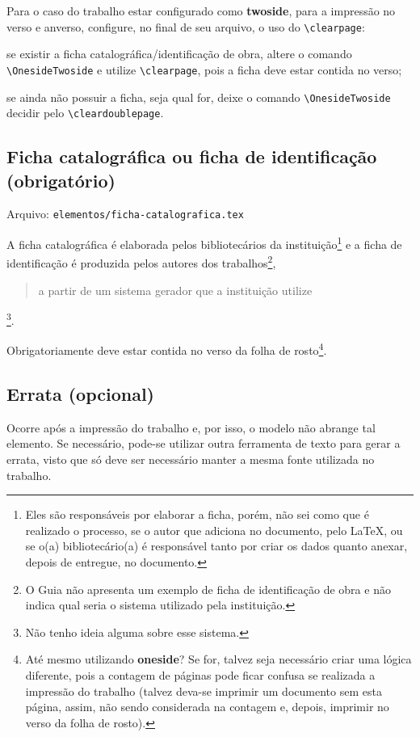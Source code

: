     Para o caso do trabalho estar configurado como \textbf{twoside}, para a impressão no verso e anverso, configure, no final de seu arquivo, o uso do \verb|\clearpage|:
    \begin{alinea}
        \item se existir a ficha catalográfica/identificação de obra, altere o comando \verb|\OnesideTwoside| e utilize \verb|\clearpage|, pois a ficha deve estar contida no verso;
        \item se ainda não possuir a ficha, seja qual for, deixe o comando \verb|\OnesideTwoside| decidir pelo \verb|\cleardoublepage|.
    \end{alinea}

\subsection{Ficha catalográfica ou ficha de identificação (obrigatório)}
    Arquivo: \texttt{elementos/ficha-catalografica.tex}

    A ficha catalográfica é elaborada pelos bibliotecários da instituição\footnote{Eles são responsáveis por elaborar a ficha, porém, não sei como que é realizado o processo, se o autor que adiciona no documento, pelo \LaTeX{}, ou se o(a) bibliotecário(a) é responsável tanto por criar os dados quanto anexar, depois de entregue, no documento.} e a ficha de identificação é produzida pelos autores dos trabalhos\footnote{O Guia não apresenta um exemplo de ficha de identificação de obra e não indica qual seria o sistema utilizado pela instituição.}, \blockcquote[p. 15]{livro:iffar-guia-normalizacao-2022}{a partir de um sistema gerador que a instituição utilize}\footnote{Não tenho ideia alguma sobre esse sistema.}.

    Obrigatoriamente deve estar contida no verso da folha de rosto\footnote{Até mesmo utilizando \textbf{oneside}? Se for, talvez seja necessário criar uma lógica diferente, pois a contagem de páginas pode ficar confusa se realizada a impressão do trabalho (talvez deva-se imprimir um documento sem esta página, assim, não sendo considerada na contagem e, depois, imprimir no verso da folha de rosto).}.
    
\subsection{Errata (opcional)}
    Ocorre após a impressão do trabalho e, por isso, o modelo não abrange tal elemento. Se necessário, pode-se utilizar outra ferramenta de texto para gerar a errata, visto que só deve ser necessário manter a mesma fonte utilizada no trabalho.
    

